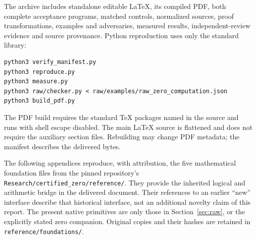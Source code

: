 \documentclass[11pt,letterpaper]{article}
\theoremstyle{definition}\newtheorem{definition}[theorem]{Definition}
\theoremstyle{remark}\newtheorem{remark}[theorem]{Remark}
\begin{document}
The archive includes standalone editable LaTeX, its compiled PDF, both
complete acceptance programs, matched controls, normalized sources,
proof transformations, examples and adversaries, measured results,
independent-review evidence and source provenance. Python reproduction
uses only the standard library:
\begin{lstlisting}[language={}]
python3 verify_manifest.py
python3 reproduce.py
python3 measure.py
python3 raw/checker.py < raw/examples/raw_zero_computation.json
python3 build_pdf.py
\end{lstlisting}
The PDF build requires the standard TeX packages named in the source and
runs with shell escape disabled. The main LaTeX source is flattened and
does not require the auxiliary section files. Rebuilding may change PDF
metadata; the manifest describes the delivered bytes.

The following appendices reproduce, with attribution, the five mathematical
foundation files from the pinned repository's
\texttt{Research/certified\_zero/reference/}. They provide the inherited
logical and arithmetic bridge in the delivered document. Their references
to an earlier ``new'' interface describe that historical interface, not
an additional novelty claim of this report. The present native primitives
are only those in Section~\ref{sec:raw}, or the explicitly stated zero
companion. Original copies and their hashes are retained in
\texttt{reference/foundations/}.

\clearpage
\appendix
\end{document}
